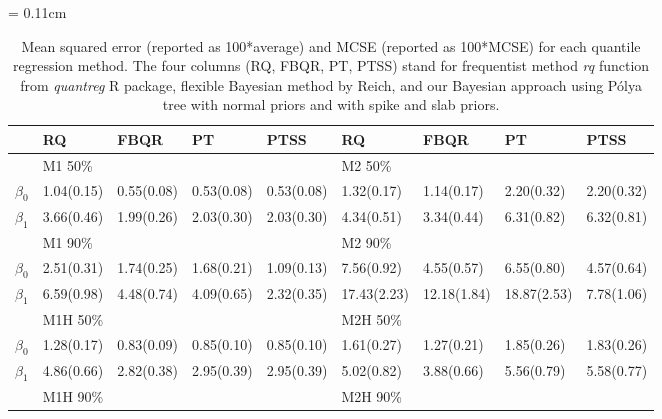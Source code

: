 \documentclass[12pt]{article}
\newcommand{\polya}{P\'{o}lya}
\begin{document}
\begin{center}
  \begin{table}[h]
    \centering
    \caption[]{ Mean squared error (reported as 100*average) and MCSE
      (reported as 100*MCSE) for each
      quantile regression method.   The four
      columns (RQ, FBQR,
      PT, PTSS) stand for frequentist method \textit{rq} function from
      \textit{quantreg} R package, flexible Bayesian method by Reich, and
      our Bayesian approach using \polya{} tree with normal priors and with
      spike and slab priors.}
    \vspace{4mm}
    \tabcolsep = 0.11cm
    \begin{tabular}[tb]{c|llll|llll}
      \hline
                & RQ            & FBQR         & PT          & PTSS        & RQ            & FBQR        & PT          & PTSS        \\
      \hline
                & M1 50\%       &              &             &             & M2 50\%       &             &             &             \\
      $\beta_0$ & 1.04(0.15)    & 0.55(0.08)   & 0.53(0.08)  & 0.53(0.08)  & 1.32(0.17)    & 1.14(0.17)  & 2.20(0.32)  & 2.20(0.32)  \\
      $\beta_1$ & 3.66(0.46)    & 1.99(0.26)   & 2.03(0.30)  & 2.03(0.30)  & 4.34(0.51)    & 3.34(0.44)  & 6.31(0.82)  & 6.32(0.81)  \\
                & M1 90\%       &              &             &             & M2 90\%       &             &             &             \\
      $\beta_0$ & 2.51(0.31)    & 1.74(0.25)   & 1.68(0.21)  & 1.09(0.13)  & 7.56(0.92)    & 4.55(0.57)  & 6.55(0.80)  & 4.57(0.64)  \\
      $\beta_1$ & 6.59(0.98)    & 4.48(0.74)   & 4.09(0.65)  & 2.32(0.35)  & 17.43(2.23)   & 12.18(1.84) & 18.87(2.53) & 7.78(1.06)  \\
      \hline
                & M1H 50\%      &              &             &             & M2H 50\%      &             &             &             \\
      $\beta_0$ & 1.28(0.17)    & 0.83(0.09)   & 0.85(0.10)  & 0.85(0.10)  & 1.61(0.27)    & 1.27(0.21)  & 1.85(0.26)  & 1.83(0.26)  \\
      $\beta_1$ & 4.86(0.66)    & 2.82(0.38)   & 2.95(0.39)  & 2.95(0.39)  & 5.02(0.82)    & 3.88(0.66)  & 5.56(0.79)  & 5.58(0.77)  \\
                & M1H 90\%      &              &             &             & M2H 90\%      &             &             &             \\

\end{tabular}
\end{table}
\end{center}
\end{document}
